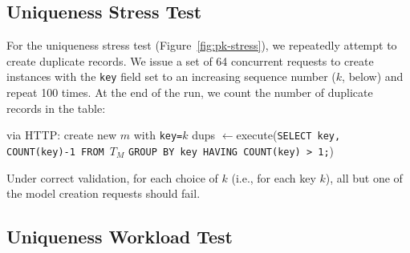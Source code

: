 \subsection{Uniqueness Stress Test}
\label{sec:appendix-uniqueness-stress}

For the uniqueness stress test (Figure~\ref{fig:pk-stress}), we repeatedly attempt to create duplicate records. We issue a set of 64 concurrent requests to create instances with the \texttt{key} field set to an increasing sequence number ($k$, below) and repeat 100 times. At the end of the run, we count the number of duplicate records in the table:
\begin{algorithm}[H]
\begin{algorithmic}
      \State via HTTP: create new $m$ with \texttt{key=$k$}
     \EndParFor
   \EndFor
   \State dups $\gets $execute(\texttt{SELECT key, COUNT(key)-1 FROM $T_M$}
   \State \hspace{6.5em}\texttt{GROUP BY key HAVING COUNT(key) > 1;})
\EndFor
\end{algorithmic}
\end{algorithm}
Under correct validation, for each choice of $k$ (i.e., for each key $k$), all but one of the model creation requests should fail.

\subsection{Uniqueness Workload Test}
\label{sec:appendix-uniqueness-workload}

